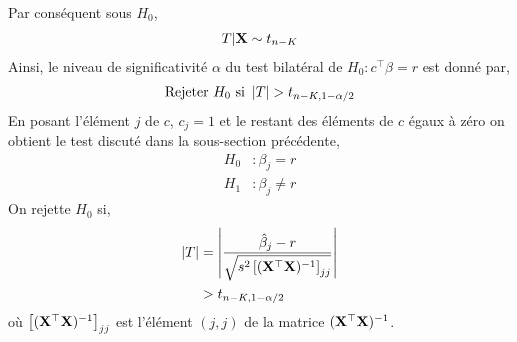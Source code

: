 Par conséquent sous $H_0$,
\begin{align*}
T | \mathbf X\sim t_{n-K}
\end{align*}
Ainsi, le niveau de significativité $\alpha$ du test bilatéral de $H_0: c^\top\beta = r$ est donné par,
\begin{align*}
\textrm{Rejeter} \ H_0 \ \textrm{si} \ \left\vert {T} \right\vert > t_{n-K, 1-\alpha/2}
\end{align*}
En posant l'élément $j$ de $c$, $c_j=1$ et le restant des éléments de $c$ égaux à zéro on obtient le test discuté dans la sous-section précédente,
\begin{align*}
H_0&: \beta_j = r\\
H_1&:\beta_j \neq r
\end{align*}
On rejette $H_0$ si,
\begin{align*}
\left\vert {T} \right\vert &= \left\vert { \frac{\hat{\beta}_j - r}{\sqrt{s^2\left[(\mathbf X^\top\mathbf X)^{-1}\right]_{jj}}}} \right\vert\\
&> t_{n-K, 1-\alpha/2}
\end{align*}
où $\left[(\mathbf X^\top\mathbf X)^{-1}\right]_{jj}$ est l'élément $(j,j)$ de la matrice $(\mathbf X^\top\mathbf X)^{-1}$.

